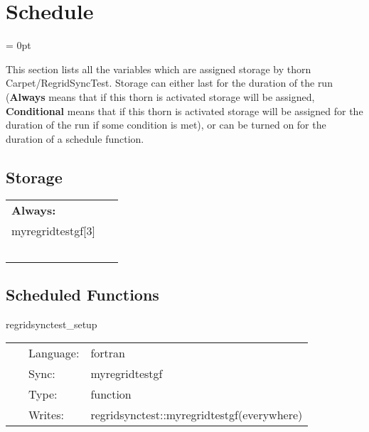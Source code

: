 
\section{Schedule} 


\parskip = 0pt


\noindent This section lists all the variables which are assigned storage by thorn Carpet/RegridSyncTest.  Storage can either last for the duration of the run ({\bf Always} means that if this thorn is activated storage will be assigned, {\bf Conditional} means that if this thorn is activated storage will be assigned for the duration of the run if some condition is met), or can be turned on for the duration of a schedule function.


\subsection*{Storage}

\hspace{5mm}

 \begin{tabular*}{160mm}{ll} 

{\bf Always:}&  ~ \\ 
 myregridtestgf[3] & ~\\ 
~ & ~\\ 
\end{tabular*} 


\subsection*{Scheduled Functions}
\vspace{5mm}


\hspace{5mm} regridsynctest\_setup 

\hspace{5mm}{\it do something at inital } 


\hspace{5mm}

 \begin{tabular*}{160mm}{cll} 
~ & Language:  & fortran \\ 
~ & Sync:  & myregridtestgf \\ 
~ & Type:  & function \\ 
~ & Writes:  & regridsynctest::myregridtestgf(everywhere) \\ 
\end{tabular*} 


